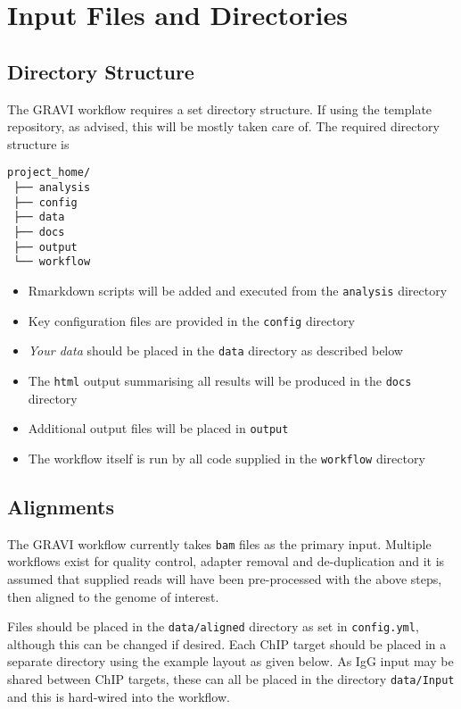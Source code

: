 \documentclass[
]{book}
\providecommand{\tightlist}{%
  \setlength{\itemsep}{0pt}\setlength{\parskip}{0pt}}
\begin{document}
\hypertarget{input-files}{%
\chapter{Input Files and Directories}\label{input-files}}

\hypertarget{directories}{%
\section{Directory Structure}\label{directories}}

The GRAVI workflow requires a set directory structure.
If using the template repository, as advised, this will be mostly taken care of.
The required directory structure is

\begin{verbatim}
project_home/
 ├── analysis
 ├── config
 ├── data
 ├── docs
 ├── output
 └── workflow
\end{verbatim}

\begin{itemize}
\tightlist
\item
  Rmarkdown scripts will be added and executed from the \texttt{analysis} directory
\item
  Key configuration files are provided in the \texttt{config} directory
\item
  \emph{Your data} should be placed in the \texttt{data} directory as described below
\item
  The \texttt{html} output summarising all results will be produced in the \texttt{docs} directory
\item
  Additional output files will be placed in \texttt{output}
\item
  The workflow itself is run by all code supplied in the \texttt{workflow} directory
\end{itemize}

\hypertarget{alignments}{%
\section{Alignments}\label{alignments}}

The GRAVI workflow currently takes \texttt{bam} files as the primary input.
Multiple workflows exist for quality control, adapter removal and de-duplication and it is assumed that supplied reads will have been pre-processed with the above steps, then aligned to the genome of interest.

Files should be placed in the \texttt{data/aligned} directory as set in \texttt{config.yml}, although this can be changed if desired.
Each ChIP target should be placed in a separate directory using the example layout as given below.
As IgG input may be shared between ChIP targets, these can all be placed in the directory \texttt{data/Input} and this is hard-wired into the workflow.
\end{document}
